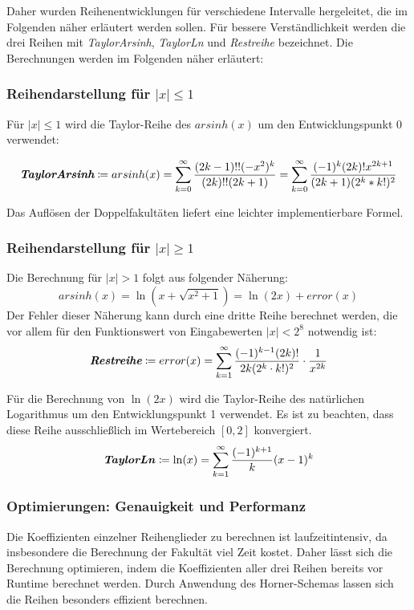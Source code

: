 \documentclass[course=erap] {aspdoc}
\begin{document}
    Daher wurden Reihenentwicklungen für verschiedene Intervalle hergeleitet, die im Folgenden näher erläutert werden sollen.
    Für bessere Verständlichkeit werden die drei Reihen mit \textit{TaylorArsinh}, \textit{TaylorLn} und \textit{Restreihe} bezeichnet.
    Die Berechnungen werden im Folgenden näher erläutert:

    \subsubsection{Reihendarstellung für $|x|\leq 1$}
    Für $|x| \leq 1$ wird die Taylor-Reihe des $arsinh(x)$ um den Entwicklungspunkt 0 verwendet:

    \[
        \textit{\textbf{TaylorArsinh}}\coloneqq arsinh(x) = \sum_{k = 0}^{\infty} \frac{(2k-1)!!(-x^2)^k}{(2k)!!(2k + 1)}
        = \sum_{k = 0}^{\infty} \frac{(-1)^k(2k)!x^{2k + 1}}{(2k + 1)(2^k*k!)^2}
    \]

    Das Auflösen der Doppelfakultäten liefert eine leichter implementierbare Formel.

    \subsubsection{Reihendarstellung für $|x|\geq 1$}
    Die Berechnung für $|x| > 1$ folgt aus folgender Näherung:
    \[
        arsinh(x) = \ln(x + \sqrt{x^2 + 1}) = \ln(2x) + error(x)
    \]
    Der Fehler dieser Näherung kann durch eine dritte Reihe berechnet werden, die vor allem für den Funktionswert von Eingabewerten $|x| < 2^{8}$ notwendig ist:
    \[
        \textit{\textbf{Restreihe}}\coloneqq error(x) =  \sum_{k = 1}^{\infty} \frac{(-1)^{k - 1}(2k)!}{2k(2^k\cdot k!)^2} \cdot \frac{1}{x^{2k}}
    \]

    Für die Berechnung von $\ln(2x)$ wird die Taylor-Reihe des natürlichen Logarithmus um den Entwicklungspunkt 1 verwendet.
    Es ist zu beachten, dass diese Reihe ausschließlich im Wertebereich $[0, 2]$ konvergiert.
    \[
        \textbf{\textit{TaylorLn}}\coloneqq\ln(x) = \sum_{k = 1}^{\infty} \frac{(-1)^{k + 1}}{k}(x - 1)^k
    \]

    \subsubsection{Optimierungen: Genauigkeit und Performanz}
    
    Die Koeffizienten einzelner Reihenglieder zu berechnen ist laufzeitintensiv, da insbesondere die Berechnung der Fakultät viel Zeit kostet.
    Daher lässt sich die Berechnung optimieren, indem die Koeffizienten aller drei Reihen bereits vor Runtime berechnet werden.
    Durch Anwendung des Horner-Schemas lassen sich die Reihen besonders effizient berechnen.
    
\end{document}
